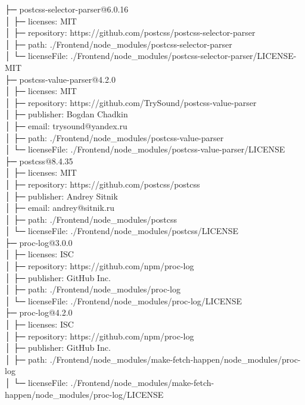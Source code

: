 ├─ postcss-selector-parser@6.0.16\\
│  ├─ licenses: MIT\\
│  ├─ repository: https://github.com/postcss/postcss-selector-parser\\
│  ├─ path: ./Frontend/node\_modules/postcss-selector-parser\\
│  └─ licenseFile: ./Frontend/node\_modules/postcss-selector-parser/LICENSE-MIT\\
├─ postcss-value-parser@4.2.0\\
│  ├─ licenses: MIT\\
│  ├─ repository: https://github.com/TrySound/postcss-value-parser\\
│  ├─ publisher: Bogdan Chadkin\\
│  ├─ email: trysound@yandex.ru\\
│  ├─ path: ./Frontend/node\_modules/postcss-value-parser\\
│  └─ licenseFile: ./Frontend/node\_modules/postcss-value-parser/LICENSE\\
├─ postcss@8.4.35\\
│  ├─ licenses: MIT\\
│  ├─ repository: https://github.com/postcss/postcss\\
│  ├─ publisher: Andrey Sitnik\\
│  ├─ email: andrey@sitnik.ru\\
│  ├─ path: ./Frontend/node\_modules/postcss\\
│  └─ licenseFile: ./Frontend/node\_modules/postcss/LICENSE\\
├─ proc-log@3.0.0\\
│  ├─ licenses: ISC\\
│  ├─ repository: https://github.com/npm/proc-log\\
│  ├─ publisher: GitHub Inc.\\
│  ├─ path: ./Frontend/node\_modules/proc-log\\
│  └─ licenseFile: ./Frontend/node\_modules/proc-log/LICENSE\\
├─ proc-log@4.2.0\\
│  ├─ licenses: ISC\\
│  ├─ repository: https://github.com/npm/proc-log\\
│  ├─ publisher: GitHub Inc.\\
│  ├─ path: ./Frontend/node\_modules/make-fetch-happen/node\_modules/proc-log\\
│  └─ licenseFile: ./Frontend/node\_modules/make-fetch-happen/node\_modules/proc-log/LICENSE\\
